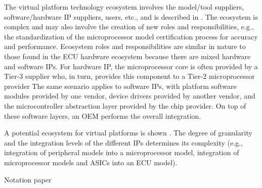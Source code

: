 The virtual platform technology ecosystem involves the model/tool suppliers, software/hardware IP suppliers, users, etc., and is described in \cite{Knauss2014d}.
The ecosystem is complex and may also involve the creation of new roles and responsibilities,
e.g., the standardization of the microprocessor model certification process  for accuracy and performance.
Ecosystem roles and responsibilities are similar in nature to those found in the ECU hardware ecosystem because there are mixed hardware and software IPs.
For hardware IP, the microprocessor core is often provided by a Tier-3 supplier who, in turn, provides this component to a Tier-2 microprocessor provider
The same scenario applies to software IPs, with platform software modules provided by one vendor, device drivers provided by another vendor, and the microcontroller abstraction layer provided by the chip provider.
On top of these software layers, an OEM performs the overall integration.

A potential ecosystem for virtual platforms is shown .
The degree of granularity and the integration levels of the different IPs determines its complexity (e.g., integration of peripheral models into a microprocessor model, integration of microprocessor models and ASICs into an ECU model).

Notation paper \cite{Sjaak Brinkkemper}